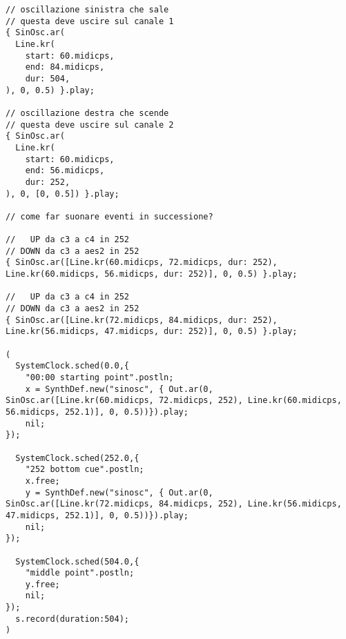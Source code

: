 \begin{lstlisting}[style=SuperCollider-IDE]
// oscillazione sinistra che sale
// questa deve uscire sul canale 1
{ SinOsc.ar(
  Line.kr(
    start: 60.midicps,
    end: 84.midicps,
    dur: 504,
), 0, 0.5) }.play;

// oscillazione destra che scende
// questa deve uscire sul canale 2
{ SinOsc.ar(
  Line.kr(
    start: 60.midicps,
    end: 56.midicps,
    dur: 252,
), 0, [0, 0.5]) }.play;

// come far suonare eventi in successione?

//   UP da c3 a c4 in 252
// DOWN da c3 a aes2 in 252
{ SinOsc.ar([Line.kr(60.midicps, 72.midicps, dur: 252), Line.kr(60.midicps, 56.midicps, dur: 252)], 0, 0.5) }.play;

//   UP da c3 a c4 in 252
// DOWN da c3 a aes2 in 252
{ SinOsc.ar([Line.kr(72.midicps, 84.midicps, dur: 252), Line.kr(56.midicps, 47.midicps, dur: 252)], 0, 0.5) }.play;

(
  SystemClock.sched(0.0,{
    "00:00 starting point".postln;
    x = SynthDef.new("sinosc", { Out.ar(0, SinOsc.ar([Line.kr(60.midicps, 72.midicps, 252), Line.kr(60.midicps, 56.midicps, 252.1)], 0, 0.5))}).play;
    nil;
});

  SystemClock.sched(252.0,{
    "252 bottom cue".postln;
    x.free;
    y = SynthDef.new("sinosc", { Out.ar(0, SinOsc.ar([Line.kr(72.midicps, 84.midicps, 252), Line.kr(56.midicps, 47.midicps, 252.1)], 0, 0.5))}).play;
    nil;
});

  SystemClock.sched(504.0,{
    "middle point".postln;
    y.free;
    nil;
});
  s.record(duration:504);
)
\end{lstlisting}

